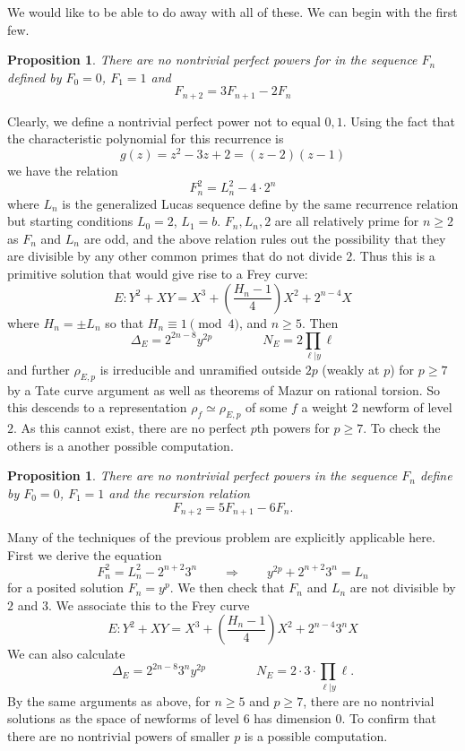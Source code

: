 \documentclass[12pt]{article}
\newtheorem{prop}[thm]{Proposition}
\newenvironment{proof}[1][Proof.]{\begin{trivlist}
\item[\hskip \labelsep {\bfseries #1}]}{\end{trivlist}}
\begin{document}
We would like to be able to do away with all of these.  We can begin with the first few.

\begin{prop}
There are no nontrivial perfect powers for in the sequence $F_n$ defined by $F_0=0$, $F_1=1$ and 
\[ F_{n+2} = 3F_{n+1}-2F_n \]
\end{prop}
\begin{proof}
Clearly, we define a nontrivial perfect power not to equal $0,1$.  Using the fact that the characteristic polynomial for this recurrence is
\[ g(z) = z^2-3z+2 = (z-2)(z-1) \]
we have the relation
\[ F_n^2 = L_n^2 - 4 \cdot 2^n \]
where $L_n$ is the generalized Lucas sequence define by the same recurrence relation but starting conditions $L_0 = 2$, $L_1 = b$.  $F_n, L_n, 2$ are all relatively prime for $n \geq 2$ as $F_n$ and $L_n$ are odd, and the above relation rules out the possibility that they are divisible by any other common primes that do not divide $2$.  Thus this is a primitive solution that would	 give rise to a Frey curve:
\[ E: Y^2 + XY = X^3 + \left(\frac{H_n-1}{4} \right)X^2 + 2^{n-4}X \]
where $H_n = \pm L_n$ so that $H_n \equiv 1 \pmod{4}$, and $n \geq 5$.  Then
\[ \Delta_E = 2^{2n-8}y^{2p} \qquad \qquad N_E = 2 \prod_{\ell | y} \ell \]
and further $\rho_{E,p}$ is irreducible and unramified outside $2p$ (weakly at $p$) for $p \geq 7$ by a Tate curve argument as well as theorems of Mazur on rational torsion.  So this descends to a representation $\rho_f \simeq \rho_{E,p}$ of some $f$ a weight 2 newform of level $2$.  As this cannot exist, there are no perfect $p$th powers for $p \geq 7$.  To check the others is a another possible computation.
\end{proof}

\begin{prop}
There are no nontrivial perfect powers in the sequence $F_n$ define by $F_0 = 0$, $F_1 = 1$ and the recursion relation
\[ F_{n+2} = 5F_{n+1}-6F_n. \]
\end{prop}

\begin{proof}
Many of the techniques of the previous problem are explicitly applicable here.  First we derive the equation
\[ F_n^2 = L_n^2 - 2^{n+2}3^n \qquad \Rightarrow \qquad y^{2p} + 2^{n+2}3^n = L_n\]
for a posited solution $F_n = y^p$.  We then check that $F_n$ and $L_n$ are not divisible by $2$ and $3$.  We associate this to the Frey curve
\[ E: Y^2 +XY = X^3 + \left(\frac{H_n-1}{4} \right)X^2 + 2^{n-4}3^nX \]
We can also calculate
\[ \Delta_E = 2^{2n-8}3^ny^{2p} \qquad \qquad N_E = 2 \cdot 3 \cdot \prod_{\ell | y} \ell .\]
By the same arguments as above, for $n \geq 5$ and $p \geq 7$, there are no nontrivial solutions as the space of newforms of level $6$ has dimension $0$.  To confirm that there are no nontrivial powers of smaller $p$ is a possible computation.
\end{proof}
\end{document}

